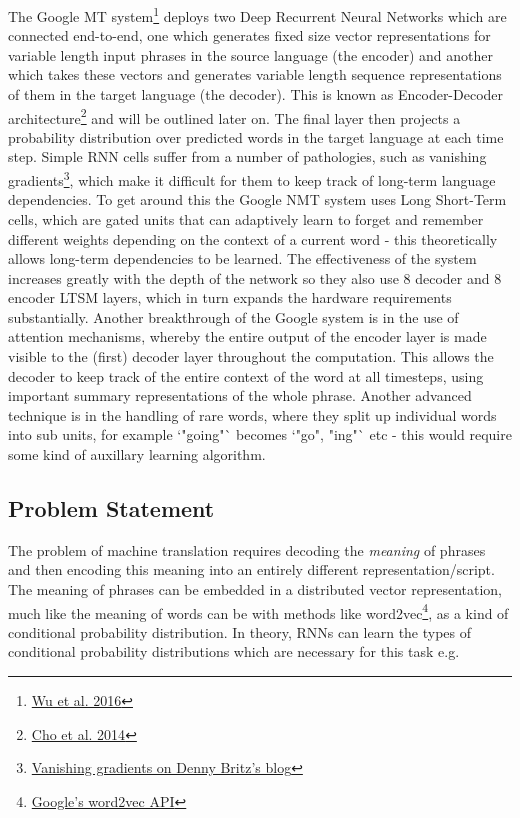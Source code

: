 \documentclass[]{article}
\begin{document}
The Google MT system\footnote{\href{https://arxiv.org/pdf/1609.08144.pdf}{Wu et al. 2016}} deploys two Deep Recurrent Neural Networks which are connected end-to-end, one which generates fixed size vector representations for variable length input phrases in the source language (the encoder) and another which takes these vectors and generates variable length sequence representations of them in the target language (the decoder). This is known as Encoder-Decoder architecture\footnote{\label{hyp:cho}\href{https://arxiv.org/pdf/1406.1078.pdf}{Cho et al. 2014}} and will be outlined later on. The final layer then projects a probability distribution over predicted words in the target language at each time step. Simple RNN cells suffer from a number of pathologies, such as vanishing gradients\footnote{\href{http://www.wildml.com/2015/10/recurrent-neural-networks-tutorial-part-3-backpropagation-through-time-and-vanishing-gradients/}{Vanishing gradients on Denny Britz's blog}}, which make it difficult for them to keep track of long-term language dependencies. To get around this the Google NMT system uses Long Short-Term cells, which are gated units that can adaptively learn to forget and remember different weights depending on the context of a current word - this theoretically allows long-term dependencies to be learned. The effectiveness of the system increases greatly with the depth of the network so they also use 8 decoder and 8 encoder LTSM layers, which in turn expands the hardware requirements substantially. Another breakthrough of the Google system is in the use of attention mechanisms, whereby the entire output of the encoder layer is made visible to the (first) decoder layer throughout the computation. This allows the decoder to keep track of the entire context of the word at all timesteps, using important summary representations of the whole phrase. Another advanced technique is in the handling of rare words, where they split up individual words into sub units, for example `"going"` becomes `"go", "ing"` etc - this would require some kind of auxillary learning algorithm. 
\subsection{Problem Statement}
The problem of machine translation requires decoding the \textit{meaning} of phrases and then encoding this meaning into an entirely different representation/script. The meaning of phrases can be embedded in a distributed vector representation, much like the meaning of words can be with methods like word2vec\footnote{\href{https://code.google.com/archive/p/word2vec/}{Google's word2vec API}}, as a kind of conditional probability distribution. In theory, RNNs can learn the types of conditional probability distributions which are necessary for this task e.g.
\end{document}
